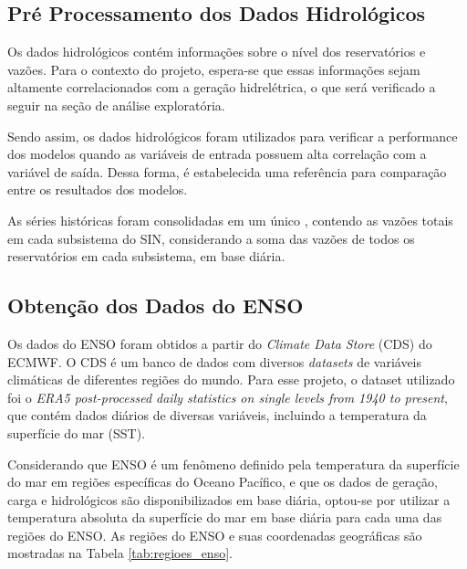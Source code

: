 \subsection{Pré Processamento dos Dados Hidrológicos} %
Os dados hidrológicos contém informações sobre o nível dos reservatórios e vazões. Para o contexto do projeto, espera-se que
essas informações sejam altamente correlacionados com a geração hidrelétrica, o que será verificado a seguir na seção de análise 
exploratória.

Sendo assim, os dados hidrológicos foram utilizados para verificar a performance dos modelos quando as variáveis de entrada
possuem alta correlação com a variável de saída. Dessa forma, é estabelecida uma referência para comparação entre os
resultados dos modelos.

As séries históricas foram consolidadas em um único , contendo as vazões totais em cada subsistema do SIN,
considerando a soma das vazões de todos os reservatórios em cada subsistema, em base diária.

\subsection{Obtenção dos Dados do ENSO} %
Os dados do ENSO foram obtidos a partir do \textit{Climate Data Store} (CDS) do ECMWF. O CDS é um banco de dados com diversos
\textit{datasets} de variáveis climáticas de diferentes regiões do mundo. Para esse projeto, o dataset utilizado foi o 
\textit{ERA5 post-processed daily statistics on single levels from 1940 to present}, que contém dados diários de diversas 
variáveis, incluindo a temperatura da superfície do mar (SST).

Considerando que ENSO é um fenômeno definido pela temperatura da superfície do mar em regiões 
específicas do Oceano Pacífico, e que os dados de geração, carga e hidrológicos são disponibilizados em base diária,
optou-se por utilizar a temperatura absoluta da superfície do mar em base diária para cada uma das regiões do ENSO. As
regiões do ENSO e suas coordenadas geográficas são mostradas na Tabela \ref{tab:regioes_enso}.

\begin{table}[htb]
  \centering
\end{table}

